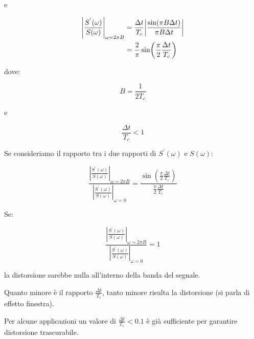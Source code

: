 e 

{
    \Large 
    \begin{equation}
        \begin{split}
            \left|\frac{S^{'} (\omega)}{S(\omega)} \right|_{\omega = 2 \pi B} 
            &= 
            \frac{\Delta t}{T_c} 
            \abs{\frac{\sin(\pi B \Delta t)}{\pi B \Delta t}} 
            \\ 
            &= 
            \frac{2}{\pi} 
            \sin(\frac{\pi}{2} \frac{\Delta t}{T_c})
        \end{split}        
    \end{equation}

}

dove: 

{
    \Large 
    \begin{equation}
        B = \frac{1}{2 T_c} 
    \end{equation}
}

e 

{
    \Large 
    \begin{equation}
        \frac{\Delta t}{T_c} < 1        
    \end{equation}
}

Se consideriamo il rapporto tra i due rapporti di $S^{'}(\omega)$ e $S(\omega)$: 

{
    \Large 
    \begin{equation}
        \frac{\left|\frac{S^{'} (\omega)}{S(\omega)} \right|_{\omega = 2 \pi B}}{\left|\frac{S^{'} (\omega)}{S(\omega)} \right|_{\omega = 0}} 
        = 
        \frac{\sin(\frac{\pi}{2} \frac{\Delta t}{T_c})}{\frac{\pi}{2} \frac{\Delta t}{T_c}}
    \end{equation}
}

Se: 

{
    \Large 
    \begin{equation}
        \frac{\left|\frac{S^{'} (\omega)}{S(\omega)} \right|_{\omega = 2 \pi B}}{\left|\frac{S^{'} (\omega)}{S(\omega)} \right|_{\omega = 0}} 
        = 
        1  
    \end{equation}
}

la distorsione sarebbe nulla all'interno della banda del segnale. \newline 

Quanto minore è il rapporto $\frac{\Delta t}{T_c}$, tanto minore risulta la distorsione (si parla di effetto finestra). \newline 

Per alcune applicazioni un valore di $\frac{\Delta t}{T_c} < 0.1$ è già sufficiente per garantire distorsione trascurabile. \newline 


